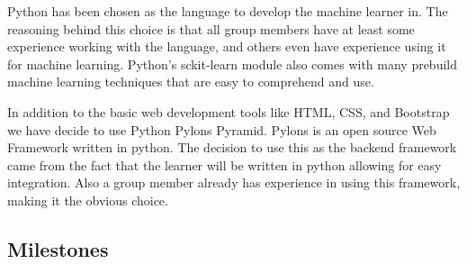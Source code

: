 \documentclass{ecmm427_assignment}
\begin{document}
\quad Python has been chosen as the language to develop the machine learner in. The reasoning behind this choice is that all group members have at least some experience working with the language, and others even have experience using it for machine learning. Python’s sckit-learn module also comes with many prebuild machine learning techniques that are easy to comprehend and use.\par

\quad In addition to the basic web development tools like HTML, CSS, and Bootstrap we have decide to use Python Pylons Pyramid. Pylons is an open source Web Framework written in python. The decision to use this as the backend framework came from the fact that the learner will be written in python allowing for easy integration. Also a group member already has experience in using this framework, making it the obvious choice.\par

\subsection{Milestones}
\end{document}
